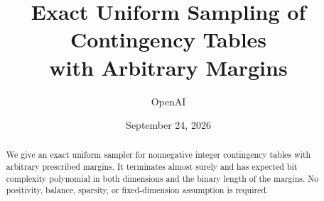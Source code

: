 \documentclass[11pt]{article}
\title{Exact Uniform Sampling of Contingency Tables\\with Arbitrary Margins}
\author{OpenAI}
\date{September 24, 2026}
\begin{document}
\maketitle
\begin{abstract}
We give an exact uniform sampler for nonnegative integer contingency tables
with arbitrary prescribed margins. It terminates almost surely and has expected
bit complexity polynomial in both dimensions and the binary length of the
margins. No positivity, balance, sparsity, or fixed-dimension assumption is
required.
\end{abstract}








\end{document}
